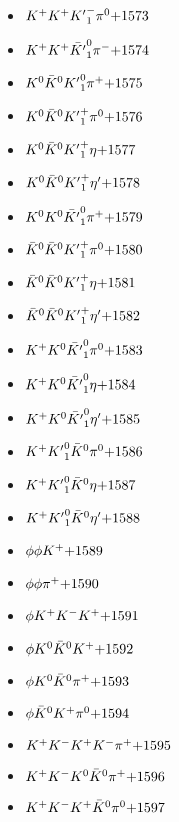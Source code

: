 \begin{multicols}{3}
\begin{itemize}
 \item $ K^{+} K^{+} {K^{\prime}}_{1}^{-} \pi^{0} \hfill{+1573}$
 \item $ K^{+} K^{+} \bar{{K^{\prime}}}_{1}^{0} \pi^{-} \hfill{+1574}$
 \item $ K^{0} \bar{K}^{0} {K^{\prime}}_{1}^{0} \pi^{+} \hfill{+1575}$
 \item $ K^{0} \bar{K}^{0} {K^{\prime}}_{1}^{+} \pi^{0} \hfill{+1576}$
 \item $ K^{0} \bar{K}^{0} {K^{\prime}}_{1}^{+} \eta \hfill{+1577}$
 \item $ K^{0} \bar{K}^{0} {K^{\prime}}_{1}^{+} {\eta^{\prime}} \hfill{+1578}$
 \item $ K^{0} K^{0} \bar{{K^{\prime}}}_{1}^{0} \pi^{+} \hfill{+1579}$
 \item $ \bar{K}^{0} \bar{K}^{0} {K^{\prime}}_{1}^{+} \pi^{0} \hfill{+1580}$
 \item $ \bar{K}^{0} \bar{K}^{0} {K^{\prime}}_{1}^{+} \eta \hfill{+1581}$
 \item $ \bar{K}^{0} \bar{K}^{0} {K^{\prime}}_{1}^{+} {\eta^{\prime}} \hfill{+1582}$
 \item $ K^{+} K^{0} \bar{{K^{\prime}}}_{1}^{0} \pi^{0} \hfill{+1583}$
 \item $ K^{+} K^{0} \bar{{K^{\prime}}}_{1}^{0} \eta \hfill{+1584}$
 \item $ K^{+} K^{0} \bar{{K^{\prime}}}_{1}^{0} {\eta^{\prime}} \hfill{+1585}$
 \item $ K^{+} {K^{\prime}}_{1}^{0} \bar{K}^{0} \pi^{0} \hfill{+1586}$
 \item $ K^{+} {K^{\prime}}_{1}^{0} \bar{K}^{0} \eta \hfill{+1587}$
 \item $ K^{+} {K^{\prime}}_{1}^{0} \bar{K}^{0} {\eta^{\prime}} \hfill{+1588}$
 \item $ \phi \phi K^{+} \hfill{+1589}$
 \item $ \phi \phi \pi^{+} \hfill{+1590}$
 \item $ \phi K^{+} K^{-} K^{+} \hfill{+1591}$
 \item $ \phi K^{0} \bar{K}^{0} K^{+} \hfill{+1592}$
 \item $ \phi K^{0} \bar{K}^{0} \pi^{+} \hfill{+1593}$
 \item $ \phi \bar{K}^{0} K^{+} \pi^{0} \hfill{+1594}$
 \item $ K^{+} K^{-} K^{+} K^{-} \pi^{+} \hfill{+1595}$
 \item $ K^{+} K^{-} K^{0} \bar{K}^{0} \pi^{+} \hfill{+1596}$
 \item $ K^{+} K^{-} K^{+} \bar{K}^{0} \pi^{0} \hfill{+1597}$

\end{itemize}
\end{multicols}
